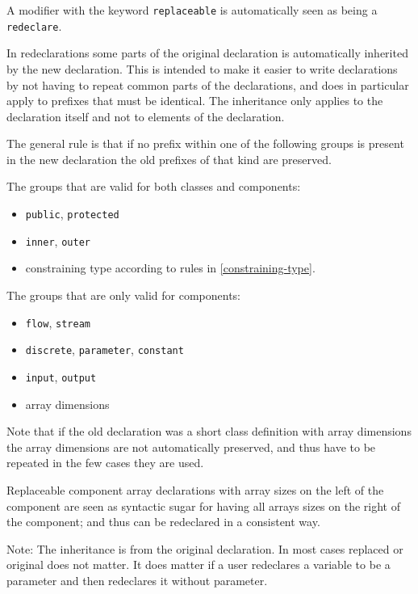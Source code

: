 A modifier with the keyword \lstinline!replaceable! is automatically seen as being a \lstinline!redeclare!.

In redeclarations some parts of the original declaration is
automatically inherited by the new declaration. This is intended to make
it easier to write declarations by not having to repeat common parts of
the declarations, and does in particular apply to prefixes that must be
identical. The inheritance only applies to the declaration itself and
not to elements of the declaration.

The general rule is that if no prefix within one of the following groups
is present in the new declaration the old prefixes of that kind are
preserved.

The groups that are valid for both classes and components:
\begin{itemize}
\item
  \lstinline!public!, \lstinline!protected!
\item
  \lstinline!inner!, \lstinline!outer!
\item
  constraining type according to rules in \cref{constraining-type}.
\end{itemize}

The groups that are only valid for components:
\begin{itemize}
\item
  \lstinline!flow!, \lstinline!stream!
\item
  \lstinline!discrete!, \lstinline!parameter!, \lstinline!constant!
\item
  \lstinline!input!, \lstinline!output!
\item
  array dimensions
\end{itemize}

Note that if the old declaration was a short class definition with array
dimensions the array dimensions are not automatically preserved, and
thus have to be repeated in the few cases they are used.

Replaceable component array declarations with array sizes on the left of
the component are seen as syntactic sugar for having all arrays sizes on
the right of the component; and thus can be redeclared in a consistent
way.

\begin{nonnormative}
Note: The inheritance is from the original declaration. In most
cases replaced or original does not matter. It does matter if a user
redeclares a variable to be a parameter and then redeclares it without
parameter.
\end{nonnormative}

